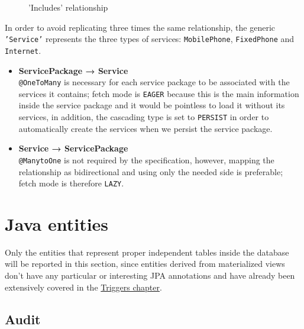 \begin{minipage}[h]{0.5\textwidth}
    \begin{figure}[H]
        
        \caption{'Includes' relationship}
        \label{fig:orm_sp_s}
    \end{figure}
\end{minipage}
\hfill
\begin{minipage}[h]{0.48\textwidth}
    In order to avoid replicating three times the same relationship, the generic \texttt{'Service'} represents the three types of services: \texttt{MobilePhone}, \texttt{FixedPhone} and \texttt{Internet}.
    \begin{itemize}
        \item \textbf{ServicePackage → Service} \\ \texttt{@OneToMany} is necessary for each service package to be associated with the services it contains; fetch mode is \texttt{EAGER} because this is the main information inside the service package and it would be pointless to load it without its services, in addition, the cascading type is set to \texttt{PERSIST} in order to automatically create the services when we persist the service package. 
        \item \textbf{Service → ServicePackage} \\ \texttt{@ManytoOne} is not required by the specification, however, mapping the relationship as bidirectional and using only the needed side is preferable; fetch mode is therefore \texttt{LAZY}.
    \end{itemize}
\end{minipage}


\section{Java entities}
\label{sec:java_ent}

Only the entities that represent proper independent tables inside the database will be reported in this section, since entities derived from materialized views don't have any particular or interesting JPA annotations and have already been extensively covered in the \hyperref[chap:views_triggers]{Triggers chapter}.

\subsection*{Audit}

